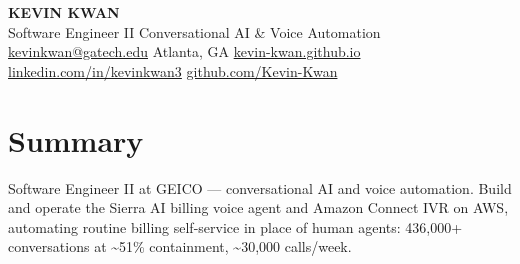 \documentclass[10pt]{article}
\begin{document}
\begin{center}
  {\fontsize{17}{20}\selectfont\bfseries KEVIN KWAN}\\[2pt]
  {\small Software Engineer II \textbar{} Conversational AI \& Voice Automation}\\[1pt]
  {\small \href{mailto:kevinkwan@gatech.edu}{kevinkwan@gatech.edu} \textbar{}
   Atlanta, GA \textbar{}
   \href{https://kevin-kwan.github.io}{kevin-kwan.github.io} \textbar{}
   \href{https://linkedin.com/in/kevinkwan3}{linkedin.com/in/kevinkwan3} \textbar{}
   \href{https://github.com/Kevin-Kwan}{github.com/Kevin-Kwan}}
\end{center}
\vspace{-8pt}

\section{Summary}
Software Engineer II at GEICO — conversational AI and voice automation. Build and operate the Sierra AI billing voice agent and Amazon Connect IVR on AWS, automating routine billing self-service in place of human agents: 436,000+ conversations at \textasciitilde51\% containment, \textasciitilde30,000 calls/week.

\end{document}
